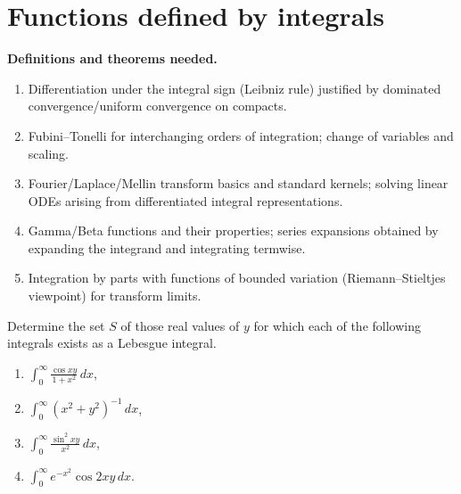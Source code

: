 \section{Functions defined by integrals}

\noindent\textbf{Definitions and theorems needed.}
\begin{enumerate}[label=(\alph*)]
    \item Differentiation under the integral sign (Leibniz rule) justified by dominated convergence/uniform convergence on compacts.
    \item Fubini–Tonelli for interchanging orders of integration; change of variables and scaling.
    \item Fourier/Laplace/Mellin transform basics and standard kernels; solving linear ODEs arising from differentiated integral representations.
    \item Gamma/Beta functions and their properties; series expansions obtained by expanding the integrand and integrating termwise.
    \item Integration by parts with functions of bounded variation (Riemann–Stieltjes viewpoint) for transform limits.
\end{enumerate}

\begin{problembox}
Determine the set $S$ of those real values of $y$ for which each of the following integrals exists as a Lebesgue integral.
\begin{enumerate}[label=(\alph*)]
    \item $\int_{0}^{\infty} \frac{\cos xy}{1 + x^2} \, dx$,
    \item $\int_{0}^{\infty} (x^2 + y^2)^{-1} \, dx$,
    \item $\int_{0}^{\infty} \frac{\sin^2 xy}{x^2} \, dx$,
    \item $\int_{0}^{\infty} e^{-x^2} \cos 2xy \, dx.$
\end{enumerate}
\end{problembox}

